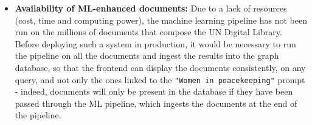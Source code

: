 \begin{itemize}
    \item \textbf{Availability of ML-enhanced documents:} Due to a lack of resources (cost, time and computing power), the machine learning pipeline has not been run on the millions of documents that compose the UN Digital Library. Before deploying such a system in production, it would be necessary to run the pipeline on all the documents and ingest the results into the graph database, so that the frontend can display the documents consistently, on any query, and not only the ones linked to the \texttt{"Women in peacekeeping"} prompt - indeed, documents will only be present in the database if they have been passed through the ML pipeline, which ingests the documents at the end of the pipeline.

\end{itemize}


